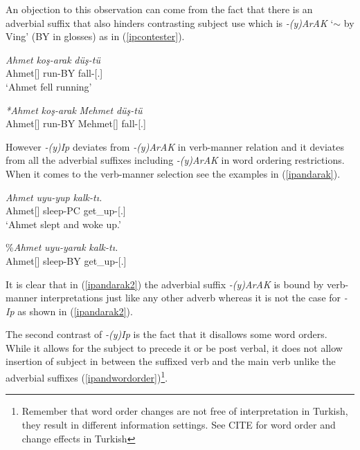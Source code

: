 An objection to this observation can come from the fact that there is an adverbial suffix that also hinders contrasting subject use which is \textit{-(y)ArAK} `$\sim$ by Ving' (BY in glosses) as in (\ref{ipcontester}).

\begin{exe}
    \ex \label{ipcontester}
    \begin{xlist}
    \ex
    \gll 
    \textit{Ahmet} \textit{koş-arak} \textit{düş-tü} \\ Ahmet[{\Nom}] run-BY fall-{\Pst}[{\Third}.{\Sg}] \\
    \glt `Ahmet fell running'
    
    \ex \gll 
    \textit{*Ahmet} \textit{koş-arak} \textit{Mehmet} \textit{düş-tü} \\ Ahmet[{\Nom}] run-BY Mehmet[{\Nom}] fall-{\Pst}[{\Third}.{\Sg}] \\
    \end{xlist}
\end{exe}

However \textit{-(y)Ip} deviates from \textit{-(y)ArAK} in verb-manner relation and it deviates from all the adverbial suffixes including \textit{-(y)ArAK} in word ordering restrictions. When it comes to the verb-manner selection see the examples in (\ref{ipandarak}).

\begin{exe}
    \ex \label{ipandarak}
    \begin{xlist}
        \ex \label{ipandarak1} \gll 
        \textit{Ahmet} \textit{uyu-yup} \textit{kalk-tı.} \\ Ahmet[{\Nom}] sleep-PC get\_up-{\Pst}[{\Third}.{\Sg}] \\
        \glt `Ahmet slept and woke up.'
        
        \ex \label{ipandarak2} \gll 
        {\%\textit{Ahmet}} \textit{uyu-yarak} \textit{kalk-tı.} \\ Ahmet[{\Nom}] sleep-BY get\_up-{\Pst}[{\Third}.{\Sg}] \\
    \end{xlist}
\end{exe}

It is clear that in (\ref{ipandarak2}) the adverbial suffix \textit{-(y)ArAK} is bound by verb-manner interpretations just like any other adverb whereas it is not the case for \textit{-Ip} as shown in (\ref{ipandarak2}). 

The second contrast of \textit{-(y)Ip} is the fact that it disallows some word orders. While it allows for the subject to precede it or be post verbal, it does not allow insertion of subject in between the suffixed verb and the main verb unlike the adverbial suffixes (\ref{ipandwordorder})\footnote{Remember that word order changes are not free of interpretation in Turkish, they result in different information settings. See CITE for word order and change effects in Turkish}. 

